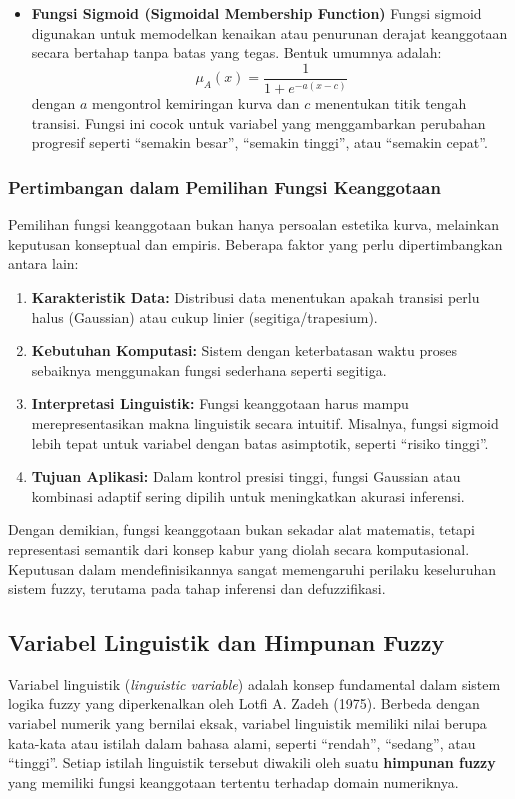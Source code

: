 \documentclass[12pt,a4paper]{article}
\theoremstyle{remark}
\begin{document}
\begin{itemize}
    \item \textbf{Fungsi Sigmoid (Sigmoidal Membership Function)}
          Fungsi sigmoid digunakan untuk memodelkan kenaikan atau penurunan derajat keanggotaan secara bertahap tanpa batas yang tegas. Bentuk umumnya adalah:
          \[
              \mu_A(x) = \frac{1}{1 + e^{-a(x-c)}}
          \]
          dengan \(a\) mengontrol kemiringan kurva dan \(c\) menentukan titik tengah transisi. Fungsi ini cocok untuk variabel yang menggambarkan perubahan progresif seperti “semakin besar”, “semakin tinggi”, atau “semakin cepat”.
\end{itemize}

\subsubsection{Pertimbangan dalam Pemilihan Fungsi Keanggotaan}
Pemilihan fungsi keanggotaan bukan hanya persoalan estetika kurva, melainkan keputusan konseptual dan empiris. Beberapa faktor yang perlu dipertimbangkan antara lain:
\begin{enumerate}
    \item \textbf{Karakteristik Data:} Distribusi data menentukan apakah transisi perlu halus (Gaussian) atau cukup linier (segitiga/trapesium).
    \item \textbf{Kebutuhan Komputasi:} Sistem dengan keterbatasan waktu proses sebaiknya menggunakan fungsi sederhana seperti segitiga.
    \item \textbf{Interpretasi Linguistik:} Fungsi keanggotaan harus mampu merepresentasikan makna linguistik secara intuitif. Misalnya, fungsi sigmoid lebih tepat untuk variabel dengan batas asimptotik, seperti “risiko tinggi”.
    \item \textbf{Tujuan Aplikasi:} Dalam kontrol presisi tinggi, fungsi Gaussian atau kombinasi adaptif sering dipilih untuk meningkatkan akurasi inferensi.
\end{enumerate}

Dengan demikian, fungsi keanggotaan bukan sekadar alat matematis, tetapi representasi semantik dari konsep kabur yang diolah secara komputasional. Keputusan dalam mendefinisikannya sangat memengaruhi perilaku keseluruhan sistem fuzzy, terutama pada tahap inferensi dan defuzzifikasi.

\subsection{Variabel Linguistik dan Himpunan Fuzzy}
Variabel linguistik (\textit{linguistic variable}) adalah konsep fundamental dalam sistem logika fuzzy yang diperkenalkan oleh Lotfi A. Zadeh (1975). Berbeda dengan variabel numerik yang bernilai eksak, variabel linguistik memiliki nilai berupa kata-kata atau istilah dalam bahasa alami, seperti “rendah”, “sedang”, atau “tinggi”. Setiap istilah linguistik tersebut diwakili oleh suatu \textbf{himpunan fuzzy} yang memiliki fungsi keanggotaan tertentu terhadap domain numeriknya.
\end{document}
